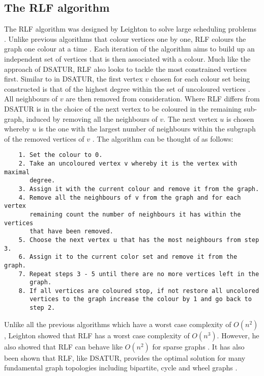 \subsection{The RLF algorithm}
The RLF algorithm was designed by Leighton to solve large scheduling problems \cite{Leighton1979AGC}. Unlike previous algorithms that colour vertices one by one, RLF colours the graph one colour at a time \cite{LewisR.M.R2015AGtG}. Each iteration of the algorithm aims to build up an independent set of vertices that is then associated with a colour. Much like the approach of DSATUR, RLF also looks to tackle the most constrained vertices first. Similar to in DSATUR, the first vertex $v$ chosen for each colour set being constructed is that of the highest degree within the set of uncoloured vertices \cite{Leighton1979AGC, LewisR.M.R2015AGtG}. All neighbours of $v$ are then removed from consideration. Where RLF differs from DSATUR is in the choice of the next vertex to be coloured in the remaining sub-graph, induced by removing all the neighbours of $v$. The next vertex $u$ is chosen whereby $u$ is the one with the largest number of neighbours within the subgraph of the removed vertices of $v$ \cite{Leighton1979AGC}. The algorithm can be thought of as follows:
\begin{verbatim}
    1. Set the colour to 0.
    2. Take an uncoloured vertex v whereby it is the vertex with maximal 
       degree.
    3. Assign it with the current colour and remove it from the graph.
    4. Remove all the neighbours of v from the graph and for each vertex 
       remaining count the number of neighbours it has within the vertices 
       that have been removed.
    5. Choose the next vertex u that has the most neighbours from step 3.
    6. Assign it to the current color set and remove it from the graph.
    7. Repeat steps 3 - 5 until there are no more vertices left in the 
       graph.
    8. If all vertices are coloured stop, if not restore all uncolored 
       vertices to the graph increase the colour by 1 and go back to 
       step 2. 
\end{verbatim}
Unlike all the previous algorithms which have a worst case complexity of $O(n^2)$, Leighton showed that RLF has a worst case complexity of $O(n^3)$. However, he also showed that RLF can behave like $O(n^2)$ for sparse graphs \cite{Leighton1979AGC}. It has also been shown that RLF, like DSATUR, provides the optimal solution for many fundamental graph topologies including bipartite, cycle and wheel graphs \cite{LewisR.M.R2015AGtG}. 
